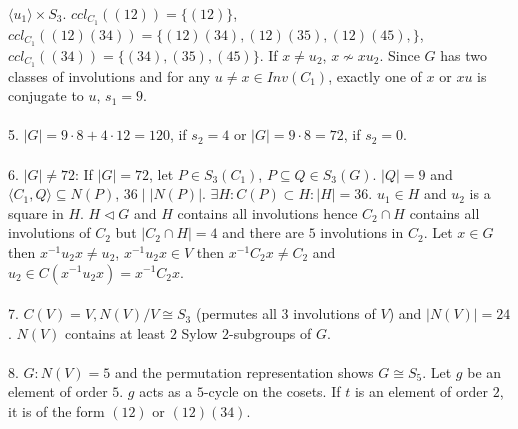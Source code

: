 $ \langle u_1 \rangle \times S_3$. 
$ccl_{C_1}((12))= \{ (12) \}$,
$ccl_{C_1}((12)(34))= \{ 
(12)(34), 
(12)(35), 
(12)(45), 
\}$, $ccl_{C_1}((34))= \{ (34) , (35), (45) \}$.  If $x \ne u_2$, $ x \nsim x u_2$.
Since $G$ has two classes of involutions and for any $u \ne x \in Inv(C_1 )$,
exactly one of $x$  or $xu$ is
conjugate to $u$, $s_1 = 9$.
\\
\\
5.
$|G|= 9 \cdot 8 + 4 \cdot 12 = 120$, if $s_2=4$ or $|G|= 9 \cdot 8 = 72$, if $s_2 = 0$.
\\
\\
6. $|G| \ne 72$: If $|G|=72$, let
$P \in S_3(C_1)$, $P \subseteq Q \in S_3(G)$.  
$|Q|=9$ and $ \langle C_1 , Q \rangle \subseteq N(P)$,
$36 \mid |N(P)|$.
$\exists H: C(P) \subset H: |H|=36$.  $u_1 \in H$ and $u_2$ is a square in $H$.
$H \lhd G$ and $H$ contains all involutions hence $C_2 \cap H$ contains all involutions of
$C_2$ but $|C_2 \cap H|=4$ and there are $5$ involutions in $C_2$.
Let $x \in G$ then $x^{-1} u_2 x \ne u_2$, $x^{-1} u_2 x \in V$ then
$x^{-1} C_2 x \ne C_2$ and
$u_2 \in C(x^{-1} u_2 x) = x^{-1} C_2 x$.
\\
\\
7.  $C(V)=V, N(V)/V \cong S_3$ (permutes all $3$ involutions of $V$) and $|N(V)|= 24$.
$N(V)$ contains at least $2$ Sylow $2$-subgroups of $G$.
\\
\\
8. $G:N(V)= 5$ and the permutation representation shows $G \cong S_5$.  Let $g$ be an element
of order $5$.  $g$ acts as a $5$-cycle on the cosets.  If $t$ is an element of order $2$,
it is of the form $(12)$ or $(12)(34)$.
